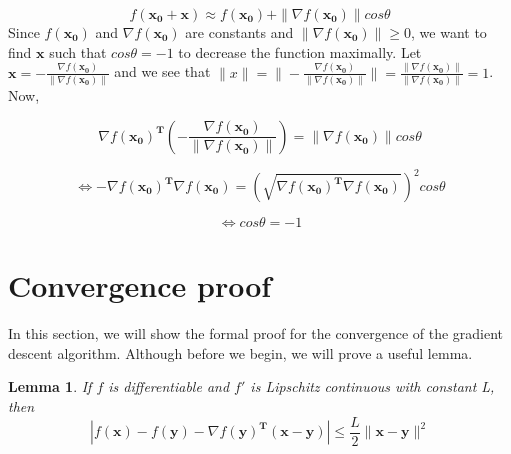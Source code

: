 \documentclass{article}
\newtheorem{lemma}{Lemma}
\begin{document}
$$f(\mathbf{x_{0}} + \mathbf{x}) \approx f(\mathbf{x_{0}}) + \| \nabla f(\mathbf{x_{0}})\|cos\theta$$
\noindent
Since $f(\mathbf{x_0})$ and $\nabla f(\mathbf{x_{0}})$ are constants and $\| \nabla f(\mathbf{x_{0}})\| \geq 0$, we want to find $\mathbf{x}$ such that $cos\theta=-1$ to decrease the function maximally. Let $\mathbf{x}=- \frac{\nabla f(\mathbf{x_0})}{\|\nabla f(\mathbf{x_0})\|}$ and we see that 
$\|x\|=\|- \frac{\nabla f(\mathbf{x_0})}{\|\nabla f(\mathbf{x_0})\|}\|=\frac{\|\nabla f(\mathbf{x_0})\|}{\|\nabla f(\mathbf{x_0})\|}=1$. Now,

$$\nabla f(\mathbf{x_{0}})^{\mathbf{T}}(- \frac{\nabla f(\mathbf{x_0})}{\|\nabla f(\mathbf{x_0})\|})=\| \nabla f(\mathbf{x_{0}})\|cos\theta$$

$$\Leftrightarrow -\nabla f(\mathbf{x_{0}})^{\mathbf{T}}\nabla f(\mathbf{x_{0}})=(\sqrt{\nabla f(\mathbf{x_{0}})^{\mathbf{T}}\nabla f(\mathbf{x_{0}})})^2cos\theta $$

$$\Leftrightarrow cos \theta = -1$$


\section{Convergence proof}
In this section, we will show the formal proof for the convergence of the gradient descent algorithm. Although before we begin, we will prove a useful lemma.
\begin{lemma}
If $f$ is differentiable and $f'$ is Lipschitz continuous with constant L, then $$|f(\mathbf{x})-f(\mathbf{y})-\nabla f(\mathbf{y})^\mathbf{T}(\mathbf{x}-\mathbf{y})|\leq\frac{L}{2}\|\mathbf{x}-\mathbf{y}\|^2$$
\end{lemma}
\end{document}
